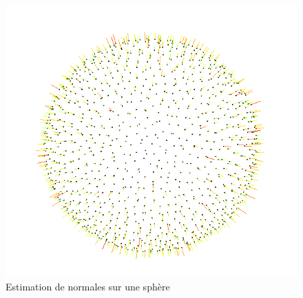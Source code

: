 \documentclass{beamer}
\begin{document}
\begin{frame}
\begin{figure}
        \includegraphics[scale=0.2]{img/sphere-sphere-1000-05}
        \caption{Estimation de normales sur une sphère}
    \end{figure}
\end{frame}
\end{document}
